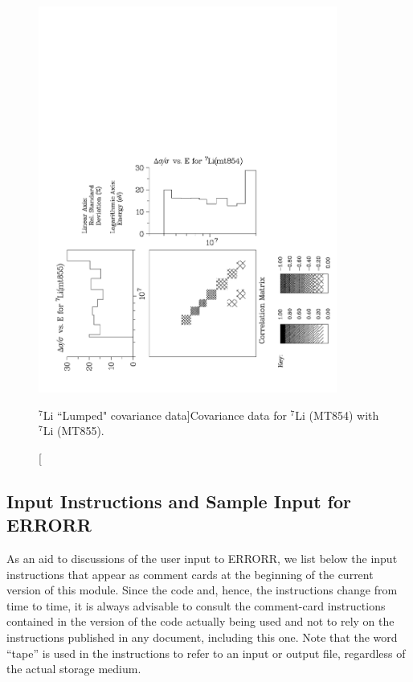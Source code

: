 \begin{figure}[thb]\centering
\includegraphics[keepaspectratio, height=5in, angle=270]{figs/errorr3ack}
\caption[$^{7}$Li ``Lumped" covariance data]{Covariance data for $^7$Li
 (MT854) with $^7$Li (MT855).}
\label{licov}
\end{figure}

\subsection{Input Instructions and Sample Input for ERRORR}
\label{ssERRORR_inp}

As an aid to discussions of the user input to ERRORR, we list below the
input instructions that appear as comment cards at the beginning of the
current version of this module.  Since the code and, hence, the
instructions change from time to time, it is always advisable to
consult the comment-card instructions contained in the version of the
code actually being used and not to rely on the instructions published
in any document, including this one.  Note that the word ``tape'' is
used in the instructions to refer to an input or output file,
regardless of the actual storage medium.

